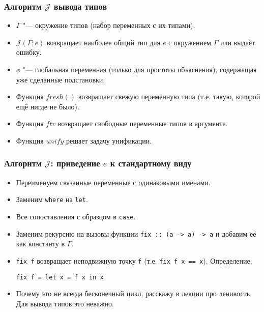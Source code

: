 \documentclass[11pt]{beamer}
\begin{document}
\newcommand{\fresh}{\mathord{\mathit{fresh}}()}
\newcommand{\J}{\mathcal{J}}
\begin{frame}[fragile]
\frametitle{Алгоритм $\J$ вывода типов}
\begin{itemize}
    \item $\Gamma$ "--- окружение типов (набор переменных с их типами).
    \item $\J(\Gamma; e)$ возвращает наиболее общий тип для $e$ с окружением $\Gamma$ или выдаёт ошибку.
    \pause
    \vspace{1em}
    \item $\phi$ "--- глобальная переменная (только для простоты объяснения), содержащая уже сделанные подстановки.
    \item Функция $\fresh$ возвращает свежую переменную типа (т.е. такую, которой ещё нигде не было).
    \item Функция $ftv$ возвращает свободные переменные типов в аргументе.
    \item Функция $unify$ решает задачу унификации.
\end{itemize}
\end{frame}

\begin{frame}[fragile]
\frametitle{Алгоритм $\J$: приведение $e$ к стандартному виду}
\begin{itemize}
    \item Переименуем связанные переменные с одинаковыми именами.
    \item Заменим \lstinline|where| на \lstinline|let|.
    \item Все сопоставления с образцом в \lstinline|case|.
    \item Заменим рекурсию на вызовы функции \lstinline|fix :: (a -> a) -> a| и добавим её как константу в $\Gamma$. 
    \item \lstinline|fix f| возвращает неподвижную точку \lstinline|f| (т.е. \lstinline|fix f x == x|). Определение: \pause
\begin{lstlisting}
fix f = let x = f x in x
\end{lstlisting}
    \pause
    \item Почему это не всегда бесконечный цикл, расскажу в лекции про ленивость. Для вывода типов это неважно.
\end{itemize}
\end{frame}
\end{document}
